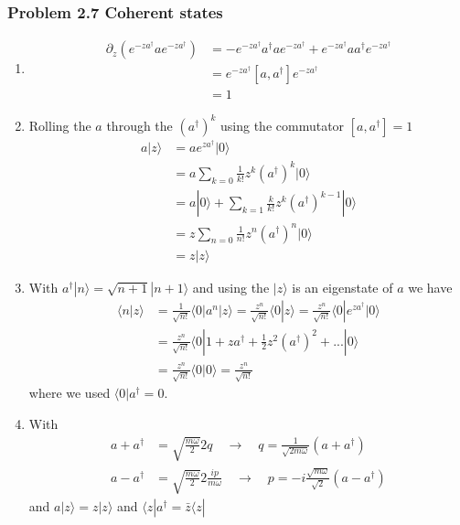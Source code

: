 \documentclass[10pt,a4paper]{book}
\theoremstyle{definition}
\begin{document}
\subsubsection{Problem 2.7 Coherent states}
\begin{enumerate}
\item 
\begin{align}
    \partial_z\left(e^{-za^\dagger} a e^{-za^\dagger}\right)
    &=-e^{-za^\dagger}a^\dagger a e^{-za^\dagger}+e^{-za^\dagger} a a^\dagger e^{-za^\dagger}\\
    &=e^{-za^\dagger} [a,a^\dagger] e^{-za^\dagger}\\
    &=1
\end{align}
\item Rolling the $a$ through the $(a^\dagger)^k$ using the commutator $[a,a^\dagger]=1$
\begin{align}
    a|z\rangle
    &=a e^{za^\dagger}|0\rangle\\
    &=a\sum_{k=0}\frac{1}{k!}z^k(a^\dagger)^k|0\rangle\\
    &=a|0\rangle+\sum_{k=1}\frac{k}{k!}z^k(a^\dagger)^{k-1}|0\rangle\\
    &=z\sum_{n=0}\frac{1}{n!}z^n(a^\dagger)^{n}|0\rangle\\
    &=z|z\rangle
\end{align}
\item With $a^\dagger|n\rangle=\sqrt{n+1}|n+1\rangle$ and using the $|z\rangle$ is an eigenstate of $a$ we have
\begin{align}
    \langle n|z\rangle&=\frac{1}{\sqrt{n!}}\langle0|a^n|z\rangle
    =\frac{z^n}{\sqrt{n!}}\langle0|z\rangle
    =\frac{z^n}{\sqrt{n!}}\langle0|e^{za^\dagger}|0\rangle\\
    &=\frac{z^n}{\sqrt{n!}}\langle0|1+za^\dagger+\frac{1}{2}z^2(a^\dagger)^2+...|0\rangle\\
    &=\frac{z^n}{\sqrt{n!}}\langle0|0\rangle
    =\frac{z^n}{\sqrt{n!}}
\end{align}
where we used $\langle0|a^\dagger=0$.
\item With
\begin{align}
    a+a^\dagger&=\sqrt{\frac{m\omega}{2}}2q\quad\rightarrow\quad q=\frac{1}{\sqrt{2m\omega}}(a+a^\dagger)\\
    a-a^\dagger&=\sqrt{\frac{m\omega}{2}}2\frac{ip}{m\omega}\quad\rightarrow\quad p=-i\frac{\sqrt{m\omega}}{\sqrt{2}}(a-a^\dagger)
\end{align}
and $a|z\rangle=z|z\rangle$ and $\langle z|a^\dagger=\bar{z}\langle z|$ 
\begin{align}

\end{align}
\end{enumerate}
\end{document}
